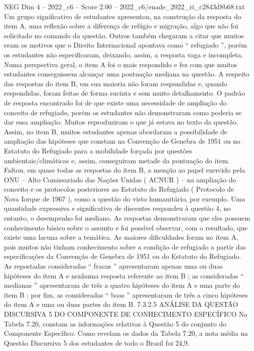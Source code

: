 \begin{textsample}{NEG Dim 4 – 2022\_c6 – Score 2.00 – 2022\_c6/enade\_2022\_ri\_c2843d8b68.txt}
Um grupo significativo de estudantes apresentou, na construção da resposta do item A, uma reflexão sobre a diferença de refúgio e migração, algo que não foi solicitado no comando da questão.
Outros também chegaram a citar que muitos eram os motivos que o Direito Internacional apontava como “ refugiado ”, porém os estudantes não especificaram, deixando, assim, a resposta vaga e incompleta.
Numa perspectiva geral, o item A foi o mais respondido e fez com que muitos estudantes conseguissem alcançar uma pontuação mediana na questão.
A respeito das respostas do item B, em sua maioria não foram respondidas e, quando respondidas, foram feitas de forma sucinta e sem muito detalhamento.
O padrão de resposta encontrado foi de que existe uma necessidade de ampliação do conceito de refugiado, porém os estudantes não demonstraram como poderia se dar essa ampliação.
Muitos reproduziram o que já estava no texto da questão.
Assim, no item B, muitos estudantes apenas abordaram a possibilidade de ampliação das hipóteses que constam na Convenção de Genebra de 1951 ou no Estatuto do Refugiado para a mobilidade forçada por questões ambientais/climáticas e, assim, conseguiram metade da pontuação do item.
Faltou, em quase todas as respostas do item B, a menção ao papel exercido pela ONU – Alto Comissariado das Nações Unidas ( ACNUR ) – na ampliação do conceito e os protocolos posteriores ao Estatuto do Refugiado ( Protocolo de Nova Iorque de 1967 ), como a questão do visto humanitário, por exemplo.
Uma quantidade expressiva e significativa de discentes respondeu à questão 4, no entanto, o desempenho foi mediano.
As respostas demonstraram que eles possuem conhecimento básico sobre o assunto e foi possível observar, com o resultado, que existe uma lacuna sobre a temática.
As maiores dificuldades foram no item A, pois muitos não tinham conhecimento sobre a condição de refugiado a partir das especificações da Convenção de Genebra de 1951 ou do Estatuto do Refugiado.
As repostadas consideradas “ fracas ” apresentaram apenas uma ou duas hipóteses do item A e nenhuma resposta referente ao item B ; as consideradas “ medianas ” apresentaram de três a quatro hipóteses do item A e uma parte do item B ; por fim, as consideradas “ boas ” apresentaram de três a cinco hipóteses do item A e uma ou duas partes do item B. 7.3.2.5 ANÁLISE DA QUESTÃO DISCURSIVA 5 DO COMPONENTE DE CONHECIMENTO ESPECÍFICO Na Tabela 7.20, constam as informações relativas à Questão 5 do conjunto do Componente Específico.
Como revelam os dados da Tabela 7.20, a nota média na Questão Discursiva 5 dos estudantes de todo o Brasil foi 24,9.

\end{textsample}
